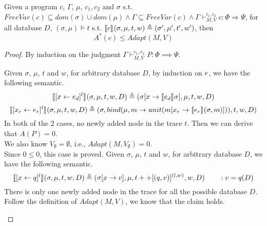 \documentclass[a4paper,11pt]{article}
\begin{document}
\begin{thm}
Given a program $c$, $\Gamma$, $\mu$, $c_1, c_2$ and $\sigma$ s.t. $
FreeVar(c) \subseteq dom(\sigma) \cup dom(\mu)  
\land \Gamma \subseteq FreeVar(c) 
\land \Gamma \vdash_{M,V}^{i_1,i_2} c : \Phi \Rightarrow \Psi$,
 for all database $D$, $(\sigma, \mu) \vDash t$ s.t. 
$\llbracket c \rrbracket_{} (\sigma, \mu , t ,w )  \triangleq  (\sigma' , \mu' , t', w' )$,
then
\[
A^*(c) \leq Adapt(M, V)
\]
\end{thm}

\begin{proof}
 By induction on the judgment $\Gamma \vdash_{M,V}^{c_1, c_2} P: \Phi \implies \Psi$.
\\ 
\begin{itemize}
%
%
Given $\sigma$, $\mu$,
$t$ and $w$,
for arbitrary database $D$, by induction on $e$, we have the following semantic.
\[ 
  \llbracket [\mathrel{ x \leftarrow e }_d]^{l} \rrbracket_{} (\sigma, \mu , t, w, D)   
  \triangleq  (\sigma[x \to \llbracket e_d\rrbracket_{} \sigma ], \mu ,  t, w , D) 
\]
%
%
\[
\llbracket [\mathrel{ x_r \leftarrow e_r }]^{l}\rrbracket_{} (\sigma, \mu , t, w, D)  
\triangleq 
(\sigma, bind(\mu , m \to unit(m[x_r \to \llbracket e_r\rrbracket_{}(\sigma, m)]) ) , t, w , D ) 
\]
%
In both of the 2 cases, no newly added node in the trace $t$. Then we can derive that $A(P) = 0$.
\\
We also know $V_{\emptyset} = \emptyset$, i.e., $Adapt(M, V_{\emptyset}) = 0$.
\\
Since $0 \leq 0$, this case is proved.
%
%
Given $\sigma$, $\mu$,  $t$ and $w$, for arbitrary database $D$, we have the following semantic.
\[ 
  \llbracket [\mathrel{ x \leftarrow q }]^{l} \rrbracket_{} (\sigma, \mu , t, w, D)   
  \triangleq  (\sigma[x \to v ], \mu ,  t ++ [(q, v)]^{(l, w)}, w , D) \qquad : v = q(D)
\]
There is only one newly added node in the trace for all the possible database $D$. 
Follow the definition of $Adapt(M,V)$, we know that the claim holds.\\
\end{itemize}
\end{proof}
\end{document}
